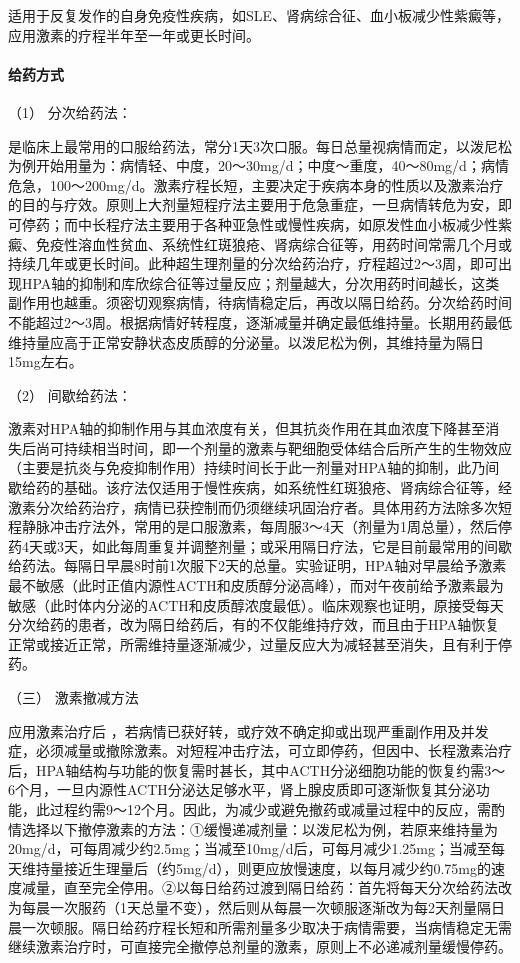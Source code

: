 适用于反复发作的自身免疫性疾病，如SLE、肾病综合征、血小板减少性紫癜等，应用激素的疗程半年至一年或更长时间。

\paragraph{给药方式}

\hypertarget{text00428.htmlux5cux23CHP17-6-4-2-5-1}{}
（1） 分次给药法：

是临床上最常用的口服给药法，常分1天3次口服。每日总量视病情而定，以泼尼松为例开始用量为：病情轻、中度，20～30mg/d；中度～重度，40～80mg/d；病情危急，100～200mg/d。激素疗程长短，主要决定于疾病本身的性质以及激素治疗的目的与疗效。原则上大剂量短程疗法主要用于危急重症，一旦病情转危为安，即可停药；而中长程疗法主要用于各种亚急性或慢性疾病，如原发性血小板减少性紫癜、免疫性溶血性贫血、系统性红斑狼疮、肾病综合征等，用药时间常需几个月或持续几年或更长时间。此种超生理剂量的分次给药治疗，疗程超过2～3周，即可出现HPA轴的抑制和库欣综合征等过量反应；剂量越大，分次用药时间越长，这类副作用也越重。须密切观察病情，待病情稳定后，再改以隔日给药。分次给药时间不能超过2～3周。根据病情好转程度，逐渐减量并确定最低维持量。长期用药最低维持量应高于正常安静状态皮质醇的分泌量。以泼尼松为例，其维持量为隔日15mg左右。

\hypertarget{text00428.htmlux5cux23CHP17-6-4-2-5-2}{}
（2） 间歇给药法：

激素对HPA轴的抑制作用与其血浓度有关，但其抗炎作用在其血浓度下降甚至消失后尚可持续相当时间，即一个剂量的激素与靶细胞受体结合后所产生的生物效应（主要是抗炎与免疫抑制作用）持续时间长于此一剂量对HPA轴的抑制，此乃间歇给药的基础。该疗法仅适用于慢性疾病，如系统性红斑狼疮、肾病综合征等，经激素分次给药治疗，病情已获控制而仍须继续巩固治疗者。具体用药方法除多次短程静脉冲击疗法外，常用的是口服激素，每周服3～4天（剂量为1周总量），然后停药4天或3天，如此每周重复并调整剂量；或采用隔日疗法，它是目前最常用的间歇给药法。每隔日早晨8时前1次服下2天的总量。实验证明，HPA轴对早晨给予激素最不敏感（此时正值内源性ACTH和皮质醇分泌高峰），而对午夜前给予激素最为敏感（此时体内分泌的ACTH和皮质醇浓度最低）。临床观察也证明，原接受每天分次给药的患者，改为隔日给药后，有的不仅能维持疗效，而且由于HPA轴恢复正常或接近正常，所需维持量逐渐减少，过量反应大为减轻甚至消失，且有利于停药。

\hypertarget{text00428.htmlux5cux23CHP17-6-4-3}{}
（三） 激素撤减方法

应用激素治疗后
，若病情已获好转，或疗效不确定抑或出现严重副作用及并发症，必须减量或撤除激素。对短程冲击疗法，可立即停药，但因中、长程激素治疗后，HPA轴结构与功能的恢复需时甚长，其中ACTH分泌细胞功能的恢复约需3～6个月，一旦内源性ACTH分泌达足够水平，肾上腺皮质即可逐渐恢复其分泌功能，此过程约需9～12个月。因此，为减少或避免撤药或减量过程中的反应，需酌情选择以下撤停激素的方法：①缓慢递减剂量：以泼尼松为例，若原来维持量为20mg/d，可每周减少约2.5mg；当减至10mg/d后，可每月减少1.25mg；当减至每天维持量接近生理量后（约5mg/d），则更应放慢速度，以每月减少约0.75mg的速度减量，直至完全停用。②以每日给药过渡到隔日给药：首先将每天分次给药法改为每晨一次服药（1天总量不变），然后则从每晨一次顿服逐渐改为每2天剂量隔日晨一次顿服。隔日给药疗程长短和所需剂量多少取决于病情需要，当病情稳定无需继续激素治疗时，可直接完全撤停总剂量的激素，原则上不必递减剂量缓慢停药。

